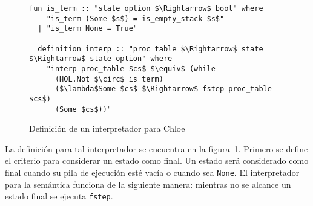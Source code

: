 \begin{figure}
  \begin{lstlisting}[frame=single, mathescape=true]
  fun is_term :: "state option $\Rightarrow$ bool" where
    "is_term (Some $s$) = is_empty_stack $s$"
  | "is_term None = True"

  definition interp :: "proc_table $\Rightarrow$ state $\Rightarrow$ state option" where
    "interp proc_table $cs$ $\equiv$ (while
      (HOL.Not $\circ$ is_term)
      ($\lambda$Some $cs$ $\Rightarrow$ fstep proc_table $cs$)
      (Some $cs$))"
  \end{lstlisting}

  \caption{Definición de un interpretador para Chloe}
  \label{fig:interpreter_def}
\end{figure}

La definición para tal interpretador se encuentra en la figura~\ref{fig:interpreter_def}.
Primero se define el criterio para considerar un estado como final.
Un estado será considerado como final cuando su pila de ejecución esté vacía o cuando sea \verb|None|.
El interpretador para la semántica funciona de la siguiente manera: mientras no se alcance un estado final se ejecuta \verb|fstep|.

\begin{comment}
Se presenta un lema que establece que si un estado es final, entonces es el resultado de la interpretación.

\begin{lemma}[interp\_term]
$\newline$
$\mathtt{is\_term}\ \mathtt{(Some}\ cs\mathtt{)}\ \Longrightarrow\ \mathtt{interp}\ \mathtt{proc\_table}\ cs\ =\ \mathtt{Some}\ cs$
\label{lemma:interp_term}
\end{lemma}

Para poder demostrar esto necesitamos un lema que expanda la definición del ciclo en la definición de nuestro interpretador:

\begin{lemma}[interp\_unfold]
$\newline$
$\mathtt{interp}\ \mathtt{proc\_table}\ cs = ($
$\newline$
$\mathtt{if}\ \mathtt{is\_term}\ (\mathtt{Some}\ cs)\ \mathtt{then}\ \mathtt{Some}\ cs$
$\newline$
$\mathtt{else}\ \mathtt{do\{}\ cs \leftarrow\ \mathtt{fstep}\ \mathtt{proc\_table}\ cs\mathtt{;}\ \mathtt{interp}\ \mathtt{proc\_table}\ cs$
$\mathtt{\}})$
\label{lemma:interp_unfold}
\end{lemma}

\begin{proof}
La demostración es hecha automáticamente.
\end{proof}

Con el lema~\ref{lemma:interp_unfold}, la demostración del lema~\ref{lemma:interp_term} se hace automáticamente.
\end{comment}

